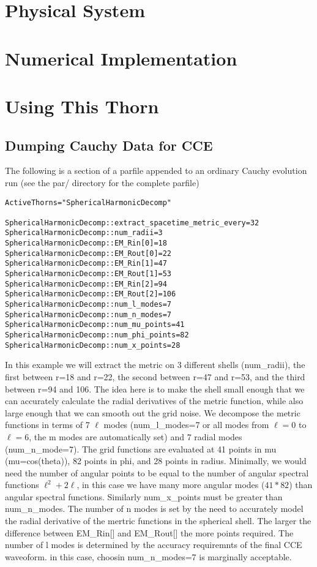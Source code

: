 \section{Physical System}

\section{Numerical Implementation}

\section{Using This Thorn}
 \subsection{Dumping Cauchy Data for CCE}
 
  The following is a section of a parfile appended to an ordinary Cauchy evolution run (see the par/ directory for the complete parfile)

\begin{verbatim}
ActiveThorns="SphericalHarmonicDecomp"

SphericalHarmonicDecomp::extract_spacetime_metric_every=32
SphericalHarmonicDecomp::num_radii=3
SphericalHarmonicDecomp::EM_Rin[0]=18
SphericalHarmonicDecomp::EM_Rout[0]=22
SphericalHarmonicDecomp::EM_Rin[1]=47
SphericalHarmonicDecomp::EM_Rout[1]=53
SphericalHarmonicDecomp::EM_Rin[2]=94
SphericalHarmonicDecomp::EM_Rout[2]=106
SphericalHarmonicDecomp::num_l_modes=7
SphericalHarmonicDecomp::num_n_modes=7
SphericalHarmonicDecomp::num_mu_points=41
SphericalHarmonicDecomp::num_phi_points=82
SphericalHarmonicDecomp::num_x_points=28

\end{verbatim}
In this example we will extract the metric on 3 different shells
 (num\_radii), the
first between r=18 and r=22, the second between r=47 and r=53, and
the third between r=94 and 106. The idea here is to make the shell
small enough that we can accurately calculate the radial derivatives
of the metric function, while also large enough that we can smooth out
the grid noise. We decompose the metric functions in terms of
7 $\ell$ modes (num\_l\_modes=7 or all modes from $\ell=0$ to $\ell=6$,
 the m modes are automatically set) 
and 7 radial modes (num\_n\_mode=7). The grid functions are evaluated
at 41 points in mu (mu=cos(theta)),  82 points in phi, and 28 points
in radius. Minimally, we would need the number of angular points to be
equal to the number of angular spectral functions $\ell^2 + 2\ell$,
in this case we have many more angular modes ($41*82$) than angular
spectral functions. Similarly num\_x\_points must be greater than
num\_n\_modes. The number of n modes is set by the need to accurately
model the radial derivative of the mertric functions in the spherical
shell. The larger the difference between EM\_Rin[] and EM\_Rout[] the
more points required. The number of l modes is determined by the accuracy
requiremnts of the final CCE waveoform. in this case, choosin
num\_n\_modes=7 is marginally acceptable.

